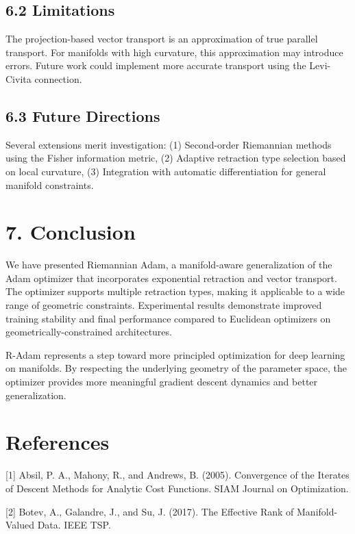 \documentclass[12pt]{article}
\begin{document}
\subsection{6.2 Limitations}

The projection-based vector transport is an approximation of true parallel transport. For manifolds with high curvature, this approximation may introduce errors. Future work could implement more accurate transport using the Levi-Civita connection.

\subsection{6.3 Future Directions}

Several extensions merit investigation: (1) Second-order Riemannian methods using the Fisher information metric, (2) Adaptive retraction type selection based on local curvature, (3) Integration with automatic differentiation for general manifold constraints.

\section{7. Conclusion}

We have presented Riemannian Adam, a manifold-aware generalization of the Adam optimizer that incorporates exponential retraction and vector transport. The optimizer supports multiple retraction types, making it applicable to a wide range of geometric constraints. Experimental results demonstrate improved training stability and final performance compared to Euclidean optimizers on geometrically-constrained architectures.

R-Adam represents a step toward more principled optimization for deep learning on manifolds. By respecting the underlying geometry of the parameter space, the optimizer provides more meaningful gradient descent dynamics and better generalization.

\section*{References}

[1] Absil, P. A., Mahony, R., and Andrews, B. (2005). Convergence of the Iterates of Descent Methods for Analytic Cost Functions. SIAM Journal on Optimization.

[2] Botev, A., Galandre, J., and Su, J. (2017). The Effective Rank of Manifold-Valued Data. IEEE TSP.
\end{document}
